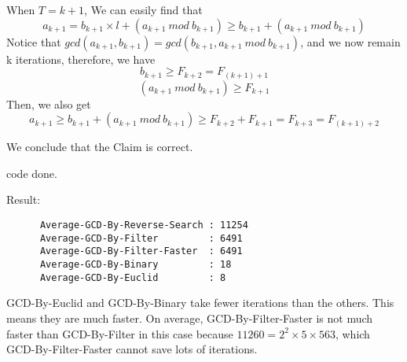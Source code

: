 \documentclass[11pt]{homework}
\begin{document}
\begin{arabicpartsdsa}
\begin{induction}
            When \(T = k+1\), We can easily find that 
            \[a_{k+1} = b_{k+1} \times l + (a_{k+1}\ mod\ b_{k+1}) \geq b_{k+1} + (a_{k+1}\ mod\ b_{k+1}) \]
            Notice that \(gcd(a_{k+1}, b_{k+1}) = gcd(b_{k+1}, a_{k+1}\ mod\ b_{k+1})\),
            and we now remain k iterations, therefore, we have 
            \[b_{k+1} \geq F_{k+2} = F_{(k+1)+1}\] 
            \[(a_{k+1}\ mod\ b_{k+1}) \geq F_{k+1}\]
            Then, we also get 
            \[a_{k+1} \geq b_{k+1} + (a_{k+1}\ mod\ b_{k+1}) \geq F_{k+2} + F_{k+1} = F_{k+3} = F_{(k+1)+2}\]

        \end{induction}
        We conclude that the Claim is correct.

    \end{arabicpartsdsa}


\question

  \begin{arabicpartsdsa}
  \item 

      code done.

  \item
      Result: \\
      \begin{verbatim}
      Average-GCD-By-Reverse-Search : 11254
      Average-GCD-By-Filter         : 6491
      Average-GCD-By-Filter-Faster  : 6491 
      Average-GCD-By-Binary         : 18
      Average-GCD-By-Euclid         : 8
      \end{verbatim}

      GCD-By-Euclid and GCD-By-Binary take fewer iterations than the others. This means they are much faster.
      On average, GCD-By-Filter-Faster is not much faster than GCD-By-Filter in this case because \(11260 = 2^2 \times 5 \times 563\),
      which GCD-By-Filter-Faster cannot save lots of iterations.
  \end{arabicpartsdsa}
\end{document}

